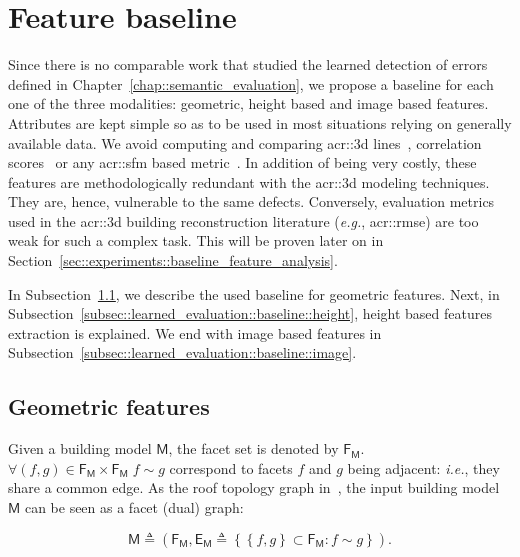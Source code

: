 \section{Feature baseline}
    \label{sec::learned_evaluation::baseline}
    Since there is no comparable work that studied the learned detection of errors defined in Chapter~\ref{chap::semantic_evaluation}, we propose a baseline for each one of the three modalities: geometric, height based and image based features.
    Attributes are kept simple so as to be used in most situations relying on generally available data.
    We avoid computing and comparing \gls{acr::3d} lines~\parencite{michelin2013quality}, correlation scores~\parencite{boudet2006supervised} or any \gls{acr::sfm} based metric~\parencite{kowdle2011active}.
    In addition of being very costly, these features are methodologically redundant with the \gls{acr::3d} modeling techniques.
    They are, hence, vulnerable to the same defects.
    Conversely, evaluation metrics used in the \gls{acr::3d} building reconstruction literature (\textit{e.g.}, \gls{acr::rmse}) are too weak for such a complex task.
    This will be proven later on in Section~\ref{sec::experiments::baseline_feature_analysis}.

    In Subsection~\ref{subsec::learned_evaluation::baseline::geometric}, we describe the used baseline for geometric features.
    Next, in Subsection~\ref{subsec::learned_evaluation::baseline::height}, height based features extraction is explained.
    We end with image based features in Subsection~\ref{subsec::learned_evaluation::baseline::image}.

    \subsection{Geometric features}
        \label{subsec::learned_evaluation::baseline::geometric}
        Given a building model \(\mathsf{M}\), the facet set is denoted by $\mathsf{F_M}$.
        $\forall (f, g) \in \mathsf{F_M} \times \mathsf{F_M} \; f \sim g$ correspond to facets $f$ and $g$ being adjacent: 
        \textit{i.e.}, they share a common edge. As the roof topology graph in~\parencite{verma20063d}, the input building model $\mathsf{M}$ can be seen as a facet (dual) graph:

        \begin{equation}
        	\label{eq::model_graph}
        	\mathsf{M} \triangleq \left(\mathsf{F_M}, \mathsf{E_M} \triangleq \left\{ \left\{f, g\right\} \subset \mathsf{F_M} : f \sim g \right\} \right).
        \end{equation}

